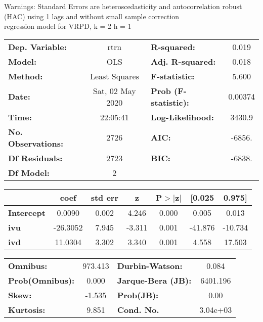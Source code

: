Warnings: \newline
 [1] Standard Errors are heteroscedasticity and autocorrelation robust (HAC) using 1 lags and without small sample correction\\ 

regression model for VRPD, k = 2 h = 1\begin{center}
\begin{tabular}{lclc}
\toprule
\textbf{Dep. Variable:}    &       rtrn       & \textbf{  R-squared:         } &     0.019   \\
\textbf{Model:}            &       OLS        & \textbf{  Adj. R-squared:    } &     0.018   \\
\textbf{Method:}           &  Least Squares   & \textbf{  F-statistic:       } &     5.600   \\
\textbf{Date:}             & Sat, 02 May 2020 & \textbf{  Prob (F-statistic):} &  0.00374    \\
\textbf{Time:}             &     22:05:41     & \textbf{  Log-Likelihood:    } &    3430.9   \\
\textbf{No. Observations:} &        2726      & \textbf{  AIC:               } &    -6856.   \\
\textbf{Df Residuals:}     &        2723      & \textbf{  BIC:               } &    -6838.   \\
\textbf{Df Model:}         &           2      & \textbf{                     } &             \\
\bottomrule
\end{tabular}
\begin{tabular}{lcccccc}
                   & \textbf{coef} & \textbf{std err} & \textbf{z} & \textbf{P$> |$z$|$} & \textbf{[0.025} & \textbf{0.975]}  \\
\midrule
\textbf{Intercept} &       0.0090  &        0.002     &     4.246  &         0.000        &        0.005    &        0.013     \\
\textbf{ivu}       &     -26.3052  &        7.945     &    -3.311  &         0.001        &      -41.876    &      -10.734     \\
\textbf{ivd}       &      11.0304  &        3.302     &     3.340  &         0.001        &        4.558    &       17.503     \\
\bottomrule
\end{tabular}
\begin{tabular}{lclc}
\textbf{Omnibus:}       & 973.413 & \textbf{  Durbin-Watson:     } &    0.084  \\
\textbf{Prob(Omnibus):} &   0.000 & \textbf{  Jarque-Bera (JB):  } & 6401.196  \\
\textbf{Skew:}          &  -1.535 & \textbf{  Prob(JB):          } &     0.00  \\
\textbf{Kurtosis:}      &   9.851 & \textbf{  Cond. No.          } & 3.04e+03  \\
\bottomrule
\end{tabular}
\end{center}

